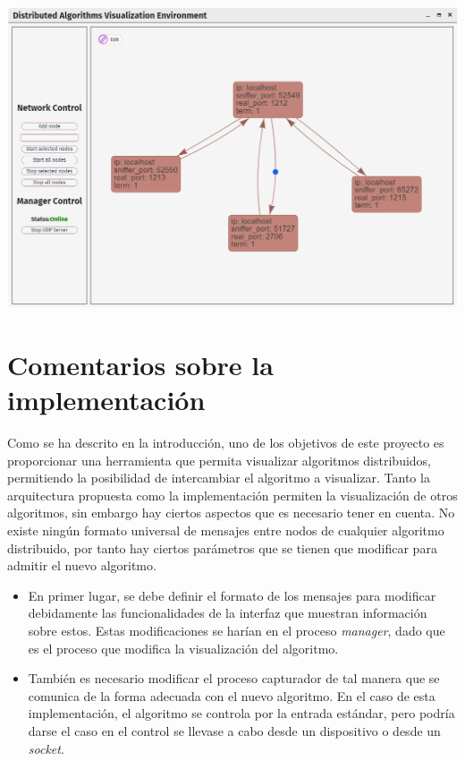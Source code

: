 {
\centering
\includegraphics[width=0.9\linewidth]{imagenes/ui8}
\label{fig:ui8}
}

\newpage

\section{Comentarios sobre la implementación}

Como se ha descrito en la introducción, uno de los objetivos de este proyecto es proporcionar una herramienta que permita visualizar algoritmos distribuidos, permitiendo la posibilidad de intercambiar el algoritmo a visualizar. Tanto la arquitectura propuesta como la implementación permiten la visualización de otros algoritmos, sin embargo hay ciertos aspectos que es necesario tener en cuenta. No existe ningún formato universal de mensajes entre nodos de cualquier algoritmo distribuido, por tanto hay ciertos parámetros que se tienen que modificar para admitir el nuevo algoritmo.

\begin{itemize}
\item En primer lugar, se debe definir el formato de los mensajes para modificar debidamente las funcionalidades de la interfaz que muestran información sobre estos. Estas modificaciones se harían en el proceso \textit{manager}, dado que es el proceso que modifica la visualización del algoritmo.

\item También es necesario modificar el proceso capturador de tal manera que se comunica de la forma adecuada con el nuevo algoritmo. En el caso de esta implementación, el algoritmo se controla por la entrada estándar, pero podría darse el caso en el control se llevase a cabo desde un dispositivo o desde un \textit{socket}.
\end{itemize}

